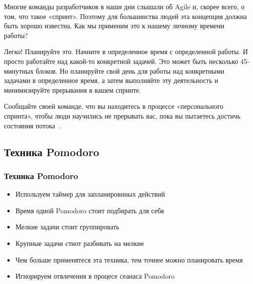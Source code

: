\documentclass{../industrial-development}
\begin{document}
\lecturenotes

Многие команды разработчиков в наши дни слышали об Agile и, скорее всего, о том, что такое «спринт». Поэтому для большинства людей эта концепция должна быть хорошо известна. Как мы применим это к нашему личному времени работы?

Легко! Планируйте это. Начните в определенное время с определенной работы. И просто работайте над какой-то конкретной задачей. Это может быть несколько 45-минутных блоков. Но планируйте свой день для работы над конкретными задачами в определенное время, а затем выполняйте эту деятельность и минимизируйте прерывания в вашем спринте.

Сообщайте своей команде, что вы находитесь в процессе «персонального спринта», чтобы люди научились не прерывать вас, пока вы пытаетесь достичь состояния потока~\cite{TMSeimer}.

\subsection{Техника Pomodoro}

\begin{frame} \frametitle{Техника Pomodoro}
  \begin{itemize}
  \item Используем таймер для запланировнных действий
  \item Время одной Pomodoro стоит подбирать для себя
  \item Мелкие задачи стоит группировать
  \item Крупные задачи стиот разбивать на мелкие
  \item Чем больше применятеся эта техника, тем точнее можно планировать время
  \item Игнорируем отвлечения в процесе сеанаса Pomodoro
  \end{itemize}
\end{frame}

\lecturenotes
\end{document}
